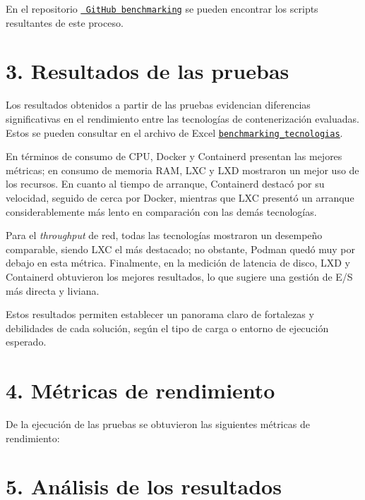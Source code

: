 En el repositorio \underline{\href{https://github.com/Anubis-1001/benchmark-tecnologias-de-contenerizacion} {\texttt{ GitHub benchmarking}}} se pueden encontrar los scripts resultantes de este proceso.

\section*{3. Resultados de las pruebas}

Los resultados obtenidos a partir de las pruebas evidencian diferencias significativas en el rendimiento entre las tecnologías de contenerización evaluadas. Estos se pueden consultar en el archivo de Excel \underline{\href{https://docs.google.com/spreadsheets/d/1Ce37Sm3Swyfa88Ur1yQbLarq_D86obUIAGGJocgQbUE/edit?usp=sharing} {\texttt{benchmarking\_tecnologias}}}.

En términos de consumo de CPU, Docker y Containerd presentan las mejores métricas; en consumo de memoria RAM, LXC y LXD mostraron un mejor uso de los recursos. En cuanto al tiempo de arranque, Containerd destacó por su velocidad, seguido de cerca por Docker, mientras que LXC presentó un arranque considerablemente más lento en comparación con las demás tecnologías.

Para el \textit{throughput} de red, todas las tecnologías mostraron un desempeño comparable, siendo LXC el más destacado; no obstante, Podman quedó muy por debajo en esta métrica. Finalmente, en la medición de latencia de disco, LXD y Containerd obtuvieron los mejores resultados, lo que sugiere una gestión de E/S más directa y liviana.

Estos resultados permiten establecer un panorama claro de fortalezas y debilidades de cada solución, según el tipo de carga o entorno de ejecución esperado.

\section*{4. Métricas de rendimiento}

De la ejecución de las pruebas se obtuvieron las siguientes métricas de rendimiento:






\section*{5. Análisis de los resultados}

